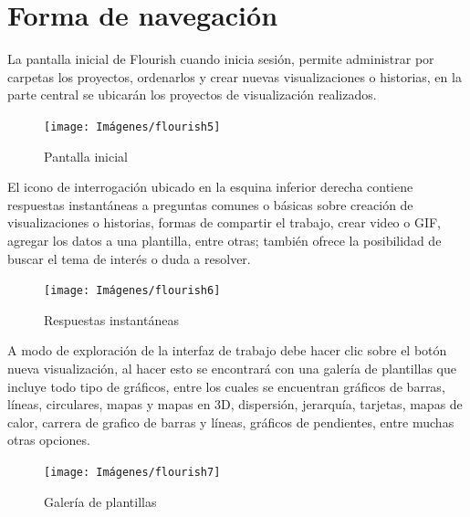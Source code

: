 \documentclass[
]{book}
\begin{document}
\hypertarget{formanavegacionflourish}{%
\section{Forma de navegación}\label{formanavegacionflourish}}

La pantalla inicial de Flourish cuando inicia sesión, permite administrar por carpetas los proyectos, ordenarlos y crear nuevas visualizaciones o historias, en la parte central se ubicarán los proyectos de visualización realizados.

\begin{figure}

{\centering \texttt{[image: Imágenes/flourish5]} 

}

\caption{Pantalla inicial}\label{fig:pantallainicialflourish-fig}
\end{figure}

El icono de interrogación ubicado en la esquina inferior derecha contiene respuestas instantáneas a preguntas comunes o básicas sobre creación de visualizaciones o historias, formas de compartir el trabajo, crear video o GIF, agregar los datos a una plantilla, entre otras; también ofrece la posibilidad de buscar el tema de interés o duda a resolver.

\begin{figure}

{\centering \texttt{[image: Imágenes/flourish6]} 

}

\caption{Respuestas instantáneas}\label{fig:respuestasinstantaneas-fig}
\end{figure}

A modo de exploración de la interfaz de trabajo debe hacer clic sobre el botón nueva visualización, al hacer esto se encontrará con una galería de plantillas que incluye todo tipo de gráficos, entre los cuales se encuentran gráficos de barras, líneas, circulares, mapas y mapas en 3D, dispersión, jerarquía, tarjetas, mapas de calor, carrera de grafico de barras y líneas, gráficos de pendientes, entre muchas otras opciones.

\begin{figure}

{\centering \texttt{[image: Imágenes/flourish7]} 

}

\caption{Galería de plantillas}\label{fig:galeriadeplantillas-fig}
\end{figure}
\end{document}
